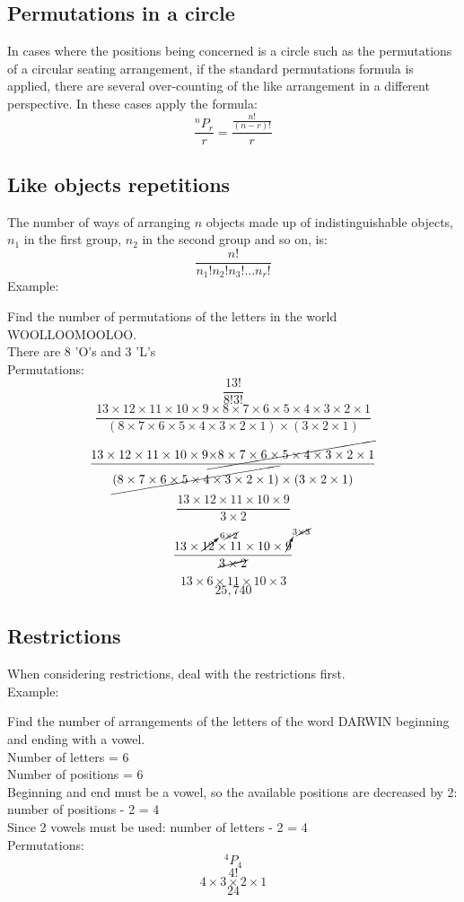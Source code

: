 \documentclass{report}
\begin{document}
\subsection{Permutations in a circle}
In cases where the positions being concerned is a circle such as the permutations of a circular seating arrangement, if the standard permutations formula is applied, there are several over-counting of the like arrangement in a different perspective.  In these cases apply the formula:
$$
	\frac{^nP_r}{r} = \frac{\frac{n!}{(n-r)!}}{r}
$$

\subsection{Like objects repetitions}
The number of ways of arranging $n$ objects made up of indistinguishable objects, $n_1$ in the first group, $n_2$ in the second group and so on, is:
$$
	\frac{n!}{n_1! n_2! n_3!... n_r!}
$$
Example:\\
\begin{center}
	Find the number of permutations of the letters in the world WOOLLOOMOOLOO.\\
	There are 8 'O's and 3 'L's\\
	Permutations:
	$$\frac{13!}{8!3!}$$
	$$\frac{13 \times 12 \times 11 \times 10 \times 9 \times 8 \times 7 \times 6 \times 5 \times 4 \times 3 \times 2 \times 1}{(8 \times 7 \times 6 \times 5 \times 4 \times 3 \times 2 \times 1) \times (3 \times 2 \times 1)}$$
	$$\frac{13 \times 12 \times 11 \times 10 \times 9 \cancel{\times 8 \times 7 \times 6 \times 5 \times 4 \times 3 \times 2 \times 1}}{\cancel{(8 \times 7 \times 6 \times 5 \times 4 \times 3 \times 2 \times 1)} \times (3 \times 2 \times 1)}$$
	$$\frac{13 \times 12 \times 11 \times 10 \times 9}{3 \times 2}$$
	$$\frac{13 \times \cancelto{6 \cancel{\times 2}}{12} \times 11 \times 10 \times \cancelto{3 \cancel{\times 3}}{9}}{\cancel{3 \times 2}}$$
	$$13 \times 6 \times 11 \times 10 \times 3$$
	$$25,740$$
\end{center}

\subsection{Restrictions}
When considering restrictions, deal with the restrictions first.\\
Example:\\
\begin{center}
	Find the number of arrangements of the letters of the word DARWIN beginning and ending with a vowel.\\
	Number of letters = 6\\
	Number of positions = 6\\
	Beginning and end must be a vowel, so the available positions are decreased by 2: number of positions - 2 = 4\\
	Since 2 vowels must be used:  number of letters - 2 = 4\\
	Permutations:
	$$^4P_4$$
	$$4!$$
	$$4 \times 3 \times 2 \times 1$$
	$$24$$
\end{center}
\end{document}
